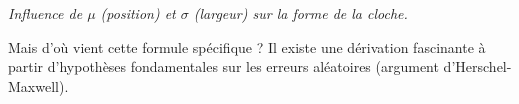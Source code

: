 \begin{intuitionbox}
\par\small\textit{Influence de $\mu$ (position) et $\sigma$ (largeur) sur la forme de la cloche.}
\end{intuitionbox}

Mais d'où vient cette formule spécifique ? Il existe une dérivation fascinante à partir d'hypothèses fondamentales sur les erreurs aléatoires (argument d'Herschel-Maxwell).






